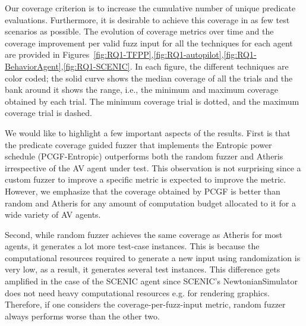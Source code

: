 Our coverage criterion is to increase the cumulative number of unique predicate evaluations.
% 
Furthermore, it is desirable to achieve this coverage in as few test scenarios as possible.
% 
The evolution of coverage metrics over time and the coverage improvement per valid fuzz input for all the techniques for each agent are provided in Figures~\ref{fig:RQ1-TFPP},\ref{fig:RQ1-autopilot},\ref{fig:RQ1-BehaviorAgent},\ref{fig:RQ1-SCENIC}.
% 
In each figure, the different techniques are color coded; the solid curve shows the median coverage of all the trials and the bank around it shows the range, i.e., the minimum and maximum coverage obtained by each trial.
% 
The minimum coverage trial is dotted, and the maximum coverage trial is dashed.




We would like to highlight a few important aspects of the results.
% 
First is that the predicate coverage guided fuzzer that implements the Entropic power schedule (PCGF-Entropic) outperforms both the random fuzzer and Atheris irrespective of the AV agent under test.
% 
This observation is not surprising since a custom fuzzer to improve a specific metric is expected to improve the metric.
% 
However, we emphasize that the coverage obtained by PCGF is better than random and Atheris for any amount of computation budget allocated to it for a wide variety of AV agents.


Second, while random fuzzer achieves the same coverage as Atheris for most agents, it generates a lot more test-case instances.
% 
This is because the computational resources required to generate a new input using randomization is very low, as a result, it generates several test instances.
%
This difference gets amplified in the case of the SCENIC agent since SCENIC's NewtonianSimulator does not need heavy computational resources e.g. for rendering graphics.
% 
Therefore, if one considers the coverage-per-fuzz-input metric, random fuzzer always performs worse than the other two.


